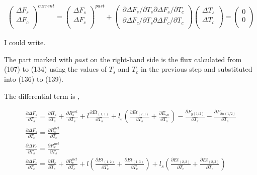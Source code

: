 \begin{eqnarray}
 \left(
\begin{array}{l}
 \Delta F_s \\
 \Delta F_c \\
\end{array}
\right)^{current}
=
\left(
\begin{array}{l}
 \Delta F_s \\
 \Delta F_c \\
\end{array}
\right)^{past}
+
\left(
\begin{array}{ll}
 {\partial \Delta F_s}/{\partial T_s} 
 {\partial \Delta F_s}/{\partial T_c} \\
 {\partial \Delta F_c}/{\partial T_s} 
 {\partial \Delta F_c}/{\partial T_c} \\
\end{array}
\right)
\left(
\begin{array}{l}
 \Delta T_s \\
 \Delta T_c \\
\end{array}
\right)
=
\left(
\begin{array}{l}
 0 \\
 0 \\
\end{array}
\right)
\end{eqnarray}

I could write.

The part marked with \(past\) on the right-hand side is the flux
calculated from (107) to (134) using the values of \(T_s\) and \(T_c\)
in the previous step and substituted into (136) to (139).

The differential term is ,

\begin{eqnarray}
 \frac{\partial \Delta F_s}{\partial T_s} =
 \frac{\partial H_s}{\partial T_s}
+\frac{\partial R^{net}_s}{\partial T_s}
+l\frac{\partial Et_{(1,1)}}{\partial T_s}
+l_s\left(\frac{\partial Et_{(2,1)}}{\partial T_s}
+    \frac{\partial E_{Sn}}{\partial T_s}\right)
-\frac{\partial F_{g(1/2)}}{\partial T_s}
-\frac{\partial F_{Sn(1/2)}}{\partial T_s} \\
 \frac{\partial \Delta F_s}{\partial T_c} =
 \frac{\partial R^{net}_s}{\partial T_c} \\
 \frac{\partial \Delta F_c}{\partial T_s} =
 \frac{\partial R^{net}_c}{\partial T_s} \\
 \frac{\partial \Delta F_c}{\partial T_c} =
 \frac{\partial H_c}{\partial T_c}
+\frac{\partial R^{net}_c}{\partial T_c}
+l  \left(\frac{\partial Et_{(1,2)}}{\partial T_c}
+         \frac{\partial Et_{(1,3)}}{\partial T_c}\right)
+l_s\left(\frac{\partial Et_{(2,2)}}{\partial T_c}
+         \frac{\partial Et_{(2,3)}}{\partial T_c}\right)
\end{eqnarray}

